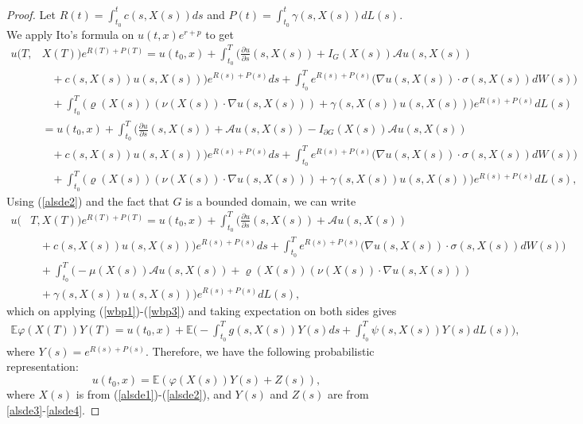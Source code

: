 \documentclass{article}
\theoremstyle{definition}
\numberwithin{equation}{section}
\begin{document}
\begin{proof}

Let $R(t) = \int_{t_0}^{t}c(s, X(s))ds$ and $P(t) = \int_{t_0}^{t}\gamma(s, X(s))d L(s)$. We apply Ito's formula on $u(t,x)e^{r + p}$ to get
\begin{align}
u(T,& X(T))e^{R(T) + P(T)} = u(t_0, x) + \int_{t_0}^{T}\Big(\frac{\partial u}{\partial s}(s, X(s)) + I_{ G}(X(s))\mathcal{A}  u(s, X(s)) \nonumber \\ & \;\;\; + c(s, X(s))u(s,X(s)) \Big)e^{R(s) + P(s)}ds   + \int_{t_0}^{T}e^{R(s) + P(s)}\big( \nabla u(s, X(s)) \cdot \sigma(s, X(s))dW(s)\big) \nonumber \\ & \;\;\; + \int_{t_0}^{T} \Big(\varrho(X(s))(\nu(X(s)) \cdot \nabla u(s, X(s)))   +  \gamma(s, X(s))u(s,X(s))\Big) e^{R(s) + P(s)} dL(s) \nonumber \\ & 
= u(t_0, x) + \int_{t_0}^{T}\Big(\frac{\partial u}{\partial s}(s, X(s)) + \mathcal{A}  u(s, X(s)) - I_{\partial G}(X(s)) \mathcal{A}u(s,X(s)) \nonumber \\ & \;\;\; + c(s, X(s))u(s,X(s)) \Big)e^{R(s) + P(s)}ds   + \int_{t_0}^{T}e^{R(s) + P(s)}\big(\nabla u(s, X(s)) \cdot \sigma(s, X(s))   dW(s)\big) \nonumber \\ & \;\;\; + \int_{t_0}^{T} \Big( \varrho(X(s))(\nu(X(s)) \cdot \nabla u(s, X(s)))   +  \gamma(s, X(s))u(s,X(s))\Big) e^{R(s) + P(s)} dL(s),
\end{align}
Using (\ref{alsde2}) and the fact that $G$ is a bounded domain, we can write
\begin{align*}
u(&T, X(T))e^{R(T) + P(T)} = 
u(t_0, x) + \int_{t_0}^{T}\Big(\frac{\partial u}{\partial s}(s, X(s)) + \mathcal{A}  u(s, X(s)) \nonumber \\ & \;\;\; + c(s, X(s))u(s,X(s)) \Big)e^{R(s) + P(s)}ds   + \int_{t_0}^{T}e^{R(s) + P(s)}\big(\nabla u(s, X(s)) \cdot \sigma(s, X(s))   dW(s)\big) \nonumber \\ & \;\;\; + \int_{t_0}^{T} \Big(- \mu(X(s))\mathcal{A}u(s,X(s)) + \varrho(X(s))(\nu(X(s)) \cdot \nabla u(s, X(s)))  \\  &  \;\;\;  +  \gamma(s, X(s))u(s,X(s))\Big) e^{R(s) + P(s)} dL(s),
\end{align*}
which on applying (\ref{wbp1})-(\ref{wbp3}) and taking expectation on both sides gives
\begin{align*}
 \mathbb{E}\varphi(X(T))Y(T) = u(t_{0}, x) + \mathbb{E}\Big(-\int_{t_{0}}^{T}g(s,X(s))Y(s)ds + \int_{t_{0}}^{T}\psi(s, X(s))Y(s)dL(s)\Big),
\end{align*}
where $Y(s) = e ^{R(s) + P(s)}$. Therefore, we have the following probabilistic representation:
\begin{equation}
    u(t_{0},x) = \mathbb{E}(\varphi(X(s))Y(s) + Z(s)),
\end{equation}
where $X(s)$ is from (\ref{alsde1})-(\ref{alsde2}), and $Y(s)$ and $Z(s)$ are from \eqref{alsde3}-\eqref{alsde4}.
\end{proof}
\end{document}
